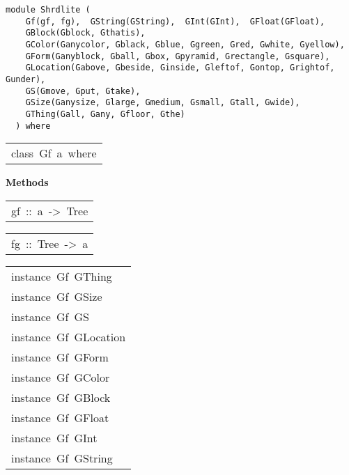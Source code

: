 \label{module:Shrdlite}
\haddockbeginheader
{\haddockverb\begin{verbatim}
module Shrdlite (
    Gf(gf, fg),  GString(GString),  GInt(GInt),  GFloat(GFloat), 
    GBlock(Gblock, Gthatis), 
    GColor(Ganycolor, Gblack, Gblue, Ggreen, Gred, Gwhite, Gyellow), 
    GForm(Ganyblock, Gball, Gbox, Gpyramid, Grectangle, Gsquare), 
    GLocation(Gabove, Gbeside, Ginside, Gleftof, Gontop, Grightof, Gunder), 
    GS(Gmove, Gput, Gtake), 
    GSize(Ganysize, Glarge, Gmedium, Gsmall, Gtall, Gwide), 
    GThing(Gall, Gany, Gfloor, Gthe)
  ) where\end{verbatim}}
\haddockendheader

\begin{haddockdesc}
\item[\begin{tabular}{@{}l}
class\ Gf\ a\ where
\end{tabular}]\haddockbegindoc
\haddockpremethods{}\textbf{Methods}
\begin{haddockdesc}
\item[\begin{tabular}{@{}l}
gf\ ::\ a\ ->\ Tree
\end{tabular}]
\end{haddockdesc}
\begin{haddockdesc}
\item[\begin{tabular}{@{}l}
fg\ ::\ Tree\ ->\ a
\end{tabular}]
\end{haddockdesc}
\end{haddockdesc}
\begin{haddockdesc}
\item[\begin{tabular}{@{}l}
instance\ Gf\ GThing\\instance\ Gf\ GSize\\instance\ Gf\ GS\\instance\ Gf\ GLocation\\instance\ Gf\ GForm\\instance\ Gf\ GColor\\instance\ Gf\ GBlock\\instance\ Gf\ GFloat\\instance\ Gf\ GInt\\instance\ Gf\ GString
\end{tabular}]
\end{haddockdesc}
